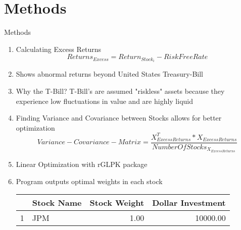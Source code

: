 \documentclass[handout,t]{beamer}
\begin{document}
    \section{Methods}
        \begin{frame}[allowframebreaks]{Methods}
        	\begin{doublespacing}
            	\begin{enumerate}
            	    \item Calculating Excess Returns
            	        \begin{equation} \label{Excess Returns}
                            Returns_{Excess} = Return_{Stock_{i}} - RiskFreeRate
                        \end{equation}
            	    \item Shows abnormal returns beyond United States Treasury-Bill 
            	    \item Why the T-Bill? T-Bill's are assumed "riskless" assets because they experience low fluctuations in value and are highly liquid
            	    
            	    \framebreak
            	    \item Finding Variance and Covariance between Stocks allows for better optimization
                         \begin{equation} \label{Variance-Covariance-Matrix}
                                Variance-Covariance-Matrix = 
                                \frac{X^{T}_{Excess Returns} * X_{Excess Returns}}
                                {Number Of Stocks_{X_{Excess Returns}}} 
                        \end{equation}
            	    
            	    \framebreak
            	    \item Linear Optimization with rGLPK package
            	    \item Program outputs optimal weights in each stock
                        \begin{table}[ht]
                        \centering
                        \begin{tabular}{rlrr}
                          \hline
                         & Stock Name & Stock Weight & Dollar Investment \\ 
                          \hline
                        1 & JPM & 1.00 & 10000.00 \\ 
                           \hline
                        \end{tabular}
                        \end{table}
                    	    

\end{enumerate}
\end{doublespacing}
\end{frame}
\end{document}
